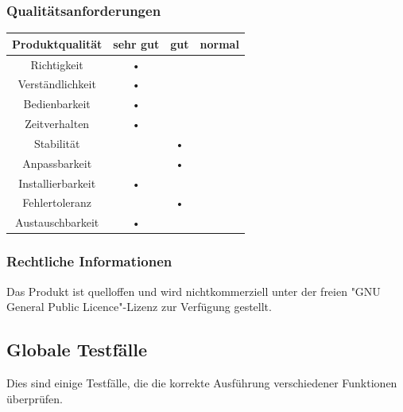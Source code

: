 \subsubsection{Qualitätsanforderungen}
\begin{center}
\begin{tabular}{|c|c|c|c|}
\hline 
\textbf{Produktqualität} & \textbf{sehr gut} & \textbf{gut} & \textbf{normal} \\ 
\hline 
Richtigkeit & • && \\ 
\hline 
Verständlichkeit & • & & \\ 
\hline 
Bedienbarkeit & • & & \\ 
\hline 
Zeitverhalten & • & & \\ 
\hline 
Stabilität & & • & \\ 
\hline 
Anpassbarkeit & & • & \\ 
\hline 
Installierbarkeit & • & & \\ 
\hline 
Fehlertoleranz & & • & \\ 
\hline 
Austauschbarkeit & • & & \\ 
\hline 
\end{tabular}
\end{center}


\subsubsection{Rechtliche Informationen}
Das Produkt ist quelloffen und wird nichtkommerziell unter der freien "GNU General Public Licence"-Lizenz zur Verfügung gestellt. 

\newpage
\subsection{Globale Testfälle}
Dies sind einige Testfälle, die die korrekte Ausführung verschiedener Funktionen überprüfen.

